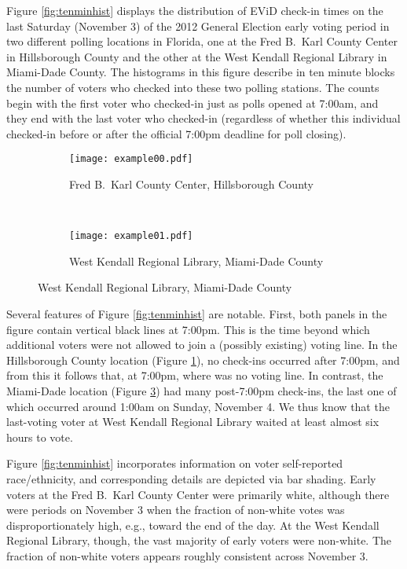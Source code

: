 \documentclass[12pt,titlepage]{article}
\begin{document}
Figure \ref{fig:tenminhist} displays the distribution of EViD check-in
times on the last Saturday (November 3) of the 2012 General Election
early voting period in two different polling locations in Florida,
one at the Fred B.\ Karl County Center in Hillsborough County and the
other at the West Kendall Regional Library in Miami-Dade County.  The
histograms in this figure describe in ten minute blocks the number of
voters who checked into these two polling stations.  The counts begin
with the first voter who checked-in just as polls opened at 7:00am,
and they end with the last voter who checked-in (regardless of whether
this individual checked-in before or after the official 7:00pm
deadline for poll closing).

\begin{figure}[!ht]
  \caption{Early voting check-in times on Saturday, November 3, 2012, in two Florida locations}
  \label{fig:tenminhist}
  \centering
  \begin{subfigure}[b]{\linewidth}
    \centering\texttt{[image: example00.pdf]}
    \caption{Fred B.\ Karl County Center, Hillsborough County}
    \label{fig:karlexample}
  \end{subfigure}%
  \\
  \begin{subfigure}[b]{\linewidth}
    \centering\texttt{[image: example01.pdf]}
    \caption{West Kendall Regional Library, Miami-Dade County}
    \label{fig:kendallexample}
  \end{subfigure}
\end{figure}

Several features of Figure \ref{fig:tenminhist} are notable.  First,
both panels in the figure contain vertical black lines at 7:00pm.
This is the time beyond which additional voters were not allowed to
join a (possibly existing) voting line.  In the Hillsborough County
location (Figure \ref{fig:karlexample}), no check-ins occurred after
7:00pm, and from this it follows that, at 7:00pm, where was no voting
line.  In contrast, the Miami-Dade location (Figure
\ref{fig:kendallexample}) had many post-7:00pm check-ins, the last one
of which occurred around 1:00am on Sunday, November 4.  We thus know
that the last-voting voter at West Kendall Regional Library waited at
least almost six hours to vote.

Figure \ref{fig:tenminhist} incorporates information on voter
self-reported race/ethnicity, and corresponding details are depicted
via bar shading.  Early voters at the Fred B.\ Karl County Center were
primarily white, although there were periods on November 3 when the
fraction of non-white votes was disproportionately high, e.g., toward
the end of the day.  At the West Kendall Regional Library, though, the
vast majority of early voters were non-white.  The fraction of
non-white voters appears roughly consistent across November 3.
\end{document}
